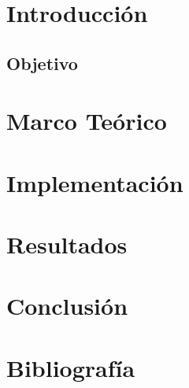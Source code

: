 \section{Introducción}
\lipsum[1-3]
\subsection {Objetivo}
\newpage

\section{Marco Teórico}
\section{Implementación}
\section{Resultados}
\section{Conclusión}
\section{Bibliografía}
